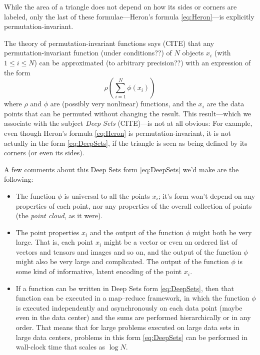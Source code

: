 \documentclass[12pt]{article}
\begin{document}
While the area of a triangle does not depend on how its sides or corners are labeled,
only the last of these formulae---Heron's formula \eqref{eq:Heron}---is explicitly permutation-invariant.

The theory of permutation-invariant functions says (CITE) that any per\-mu\-tation-invariant function (under conditions??) of $N$ objects $x_i$ (with $1\leq i\leq N$) can be approximated (to arbitrary precision??) with an expression of the form
\begin{equation}
    \rho(\sum_{i=1}^N\phi(x_i)) \label{eq:DeepSets}
\end{equation}
where $\rho$ and $\phi$ are (possibly very nonlinear) functions,
and the $x_i$ are the data points that can be permuted without changing the result.
This result---which we associate with the subject \emph{Deep Sets} (CITE)---is not at all obvious:
For example, even though Heron's formula \eqref{eq:Heron} is permutation-invariant, it is not actually in the form \eqref{eq:DeepSets}, if the triangle is seen as being defined by its corners (or even its sides).

A few comments about this Deep Sets form \eqref{eq:DeepSets} we'd make are the following:
\begin{itemize}
    \item The function $\phi$ is universal to all the points $x_i$; it's form won't depend on any properties of each point, nor any properties of the overall collection of points (the \emph{point cloud}, as it were).
    \item The point properties $x_i$ and the output of the function $\phi$ might both be very large.
    That is, each point $x_i$ might be a vector or even an ordered list of vectors and tensors and images and so on, and the output of the function $\phi$ might also be very large and complicated.
    The output of the function $\phi$ is some kind of informative, latent encoding of the point $x_i$.
    \item If a function can be written in Deep Sets form \eqref{eq:DeepSets}, then that function can be executed in a map--reduce framework, in which the function $\phi$ is executed independently and asynchronously on each data point (maybe even in the data center) and the sums are performed hierarchically or in any order.
    That means that for large problems executed on large data sets in large data centers, problems in this form \eqref{eq:DeepSets} can be performed in wall-clock time that scales as $\log N$.
\end{itemize}
\end{document}
